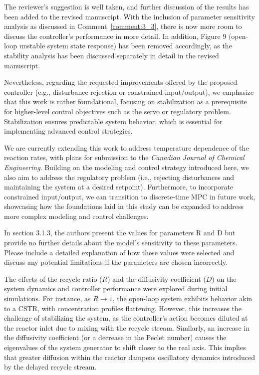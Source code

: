 \documentclass[11pt,answers]{exam}
\begin{document}
\begin{questions}
    \begin{solutionorbox} \label{comment:3_2}
        The reviewer's suggestion is well taken, and further discussion of the results has been added to the revised manuscript. With the inclusion of parameter sensitivity analysis as discussed in Comment~\ref{comment:3_3}, there is now more room to discuss the controller's performance in more detail. In addition, Figure 9 (open-loop unstable system state response) has been removed accordingly, as the stability analysis has been discussed separately in detail in the revised manuscript. 

        Nevertheless, regarding the requested improvements offered by the proposed controller (e.g., disturbance rejection or constrained input/output), we emphasize that this work is rather foundational, focusing on stabilization as a prerequisite for higher-level control objectives such as the servo or regulatory problem. Stabilization ensures predictable system behavior, which is essential for implementing advanced control strategies.
        
        We are currently extending this work to address temperature dependence of the reaction rates, with plans for submission to the \textit{Canadian Journal of Chemical Engineering}. Building on the modeling and control strategy introduced here, we also aim to address the regulatory problem (i.e., rejecting disturbances and maintaining the system at a desired setpoint). Furthermore, to incorporate constrained input/output, we can transition to discrete-time MPC in future work, showcasing how the foundations laid in this study can be expanded to address more complex modeling and control challenges.
    \end{solutionorbox}


    \question In section 3.1.3, the authors present the values for parameters R and D but provide no further details about the model's sensitivity to these parameters. Please include a detailed explanation of how these values were selected and discuss any potential limitations if the parameters are chosen incorrectly.

    \begin{solutionorbox} \label{comment:3_3}
        The effects of the recycle ratio (\(R\)) and the diffusivity coefficient (\(D\)) on the system dynamics and controller performance were explored during initial simulations. For instance, as \(R \to 1\), the open-loop system exhibits behavior akin to a CSTR, with concentration profiles flattening. However, this increases the challenge of stabilizing the system, as the controller's action becomes diluted at the reactor inlet due to mixing with the recycle stream. Similarly, an increase in the diffusivity coefficient (or a decrease in the Peclet number) causes the eigenvalues of the system generator to shift closer to the real axis. This implies that greater diffusion within the reactor dampens oscillatory dynamics introduced by the delayed recycle stream.


\end{solutionorbox}
\end{questions}
\end{document}
